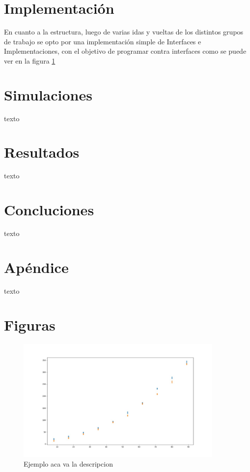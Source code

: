 \documentclass{article}
\begin{document}
\section{Implementación}
En cuanto a la estructura, luego de varias idas y vueltas de los distintos grupos de trabajo se opto por una implementación simple de Interfaces e Implementaciones, con el objetivo de programar contra interfaces como se puede ver en la figura \ref{grafico}



\section{Simulaciones}
texto

\section{Resultados}
texto

\section{Concluciones}
texto

\section{Apéndice}
texto

\clearpage
\section{Figuras}
\begin{figure}[h]
\begin{center}
\includegraphics[width=4in]{./images/inputVsOutput.jpeg}
\caption{Ejemplo aca va la descripcion }
\label{grafico}
\end{center}
\end{figure}
\clearpage
\end{document}
